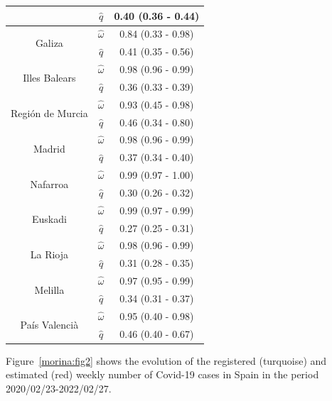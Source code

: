 \documentclass{article}
\begin{document}
\begin{table}[h]
\begin{tabular}{ccc}
                                & $\hat{q}$       & 0.40 (0.36 - 0.44) \\
\midrule
\multirow{2}{*}{Galiza}     & $\hat{\omega}$  & 0.84 (0.33 - 0.98) \\
                            & $\hat{q}$       & 0.41 (0.35 - 0.56) \\
\midrule
\multirow{2}{*}{Illes Balears}    & $\hat{\omega}$  & 0.98 (0.96 - 0.99) \\
                                  & $\hat{q}$       & 0.36 (0.33 - 0.39) \\
\midrule
\multirow{2}{*}{Regi\'on de Murcia}    & $\hat{\omega}$  & 0.93 (0.45 - 0.98) \\
                                       & $\hat{q}$       & 0.46 (0.34 - 0.80) \\
\midrule
\multirow{2}{*}{Madrid}      & $\hat{\omega}$  & 0.98 (0.96 - 0.99) \\
                             & $\hat{q}$       & 0.37 (0.34 - 0.40) \\
\midrule
\multirow{2}{*}{Nafarroa}    & $\hat{\omega}$  & 0.99 (0.97 - 1.00) \\
                             & $\hat{q}$       & 0.30 (0.26 - 0.32)\\
\midrule
\multirow{2}{*}{Euskadi}    & $\hat{\omega}$  & 0.99 (0.97 - 0.99) \\
                            & $\hat{q}$       & 0.27 (0.25 - 0.31) \\
\midrule
\multirow{2}{*}{La Rioja}    & $\hat{\omega}$  & 0.98 (0.96 - 0.99) \\
                             & $\hat{q}$       & 0.31 (0.28 - 0.35) \\
\midrule
\multirow{2}{*}{Melilla}    & $\hat{\omega}$  & 0.97 (0.95 - 0.99) \\
                            & $\hat{q}$       & 0.34 (0.31 - 0.37) \\
\midrule
\multirow{2}{*}{Pa\'is Valenci\`a}    & $\hat{\omega}$  & 0.95 (0.40 - 0.98) \\
                                      & $\hat{q}$       & 0.46 (0.40 - 0.67) \\
\bottomrule
\end{tabular}
\end{table}

Figure~\ref{morina:fig2} shows the evolution of the registered (turquoise) and estimated (red) weekly number of Covid-19 cases in Spain in the period 2020/02/23-2022/02/27.
\end{document}
